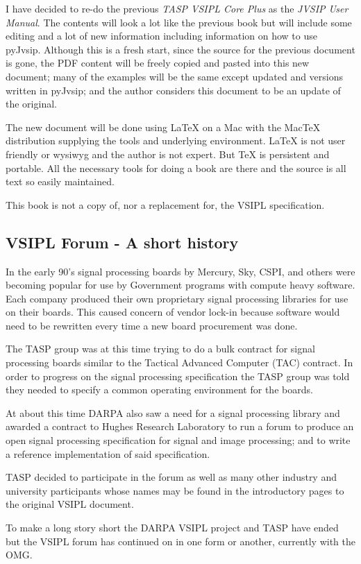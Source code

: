 I have decided to re-do the previous \emph{TASP VSIPL Core Plus} as the \emph{JVSIP User Manual}. The contents will look a lot like the previous book but will include some editing and a lot of new information including information on how to use pyJvsip.  Although this is a fresh start, since the source for the previous document is gone, the PDF content will be freely copied and pasted into this new document; many of the examples will be the same except updated and versions written in pyJvsip; and the author considers this document to be an update of the original. 

The new document will be done using LaTeX on a Mac with the MacTeX distribution supplying the tools and underlying environment.  LaTeX is not user friendly or wysiwyg and the author is not expert. But TeX is persistent and portable. All the necessary tools for doing a book are there and the source is all text so easily maintained. 

This book is not a copy of, nor a replacement for, the VSIPL specification.
\subsection*{VSIPL Forum - A short history}
In the early 90's signal processing boards by Mercury, Sky, CSPI, and others were becoming popular for use by Government  programs with compute heavy software.  Each company produced their own proprietary signal processing libraries for use on their boards. This caused concern of vendor lock-in because software would need to be rewritten every time a new board procurement was done.

The TASP group was at this time trying to do a bulk contract for signal processing boards similar to the Tactical Advanced Computer (TAC) contract.  In order to progress on the signal processing specification the TASP group was told they needed to specify a common operating environment for the boards. 

At about this time DARPA also saw a need for a signal processing library and awarded a contract to Hughes Research Laboratory to run a forum to produce an open signal processing specification for signal and image processing; and to write a reference implementation of said specification. 

TASP decided to participate in the forum as well as many other industry and university participants whose names may be found in the introductory pages to the original VSIPL document.

To make a long story short the DARPA VSIPL project and TASP have ended but the VSIPL forum has continued on in one form or another, currently with the OMG.  

